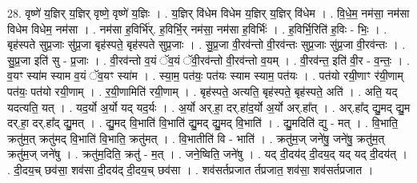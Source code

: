 \documentclass[17pt]{extarticle}
\begin{document}
28. वृष्णे॑ य॒ज्ञिर् य॒ज्ञिर् वृष्णे॒ वृष्णे॑ य॒ज्ञिः । . य॒ज्ञिर् वि॑धेम विधेम य॒ज्ञिर् य॒ज्ञिर् वि॑धेम । . वि॒धे॒म॒ नम॑सा॒ नम॑सा विधेम विधेम॒ नम॑सा । . नम॑सा ह॒विर्भि॑र्. ह॒विर्भि॒र् नम॑सा॒ नम॑सा ह॒विर्भिः॑ । . ह॒विर्भि॒रिति॑ ह॒विः - भिः॒ । . बृह॑स्पते सुप्र॒जाः सु॑प्र॒जा बृह॑स्पते॒ बृह॑स्पते सुप्र॒जाः । . सु॒प्र॒जा वी॒रव॑न्तो वी॒रव॑न्तः सुप्र॒जाः सु॑प्र॒जा वी॒रव॑न्तः । . सु॒प्र॒जा इति॑ सु - प्र॒जाः । . वी॒रव॑न्तो व॒यं ॅव॒यं ॅवी॒रव॑न्तो वी॒रव॑न्तो व॒यम् । . वी॒रव॑न्त॒ इति॑ वी॒र - व॒न्तः॒ । . व॒यꣳ स्या॑म स्याम व॒यं ॅव॒यꣳ स्या॑म । . स्या॒म॒ पत॑यः॒ पत॑यः स्याम स्याम॒ पत॑यः । . पत॑यो रयी॒णाꣳ र॑यी॒णाम् पत॑यः॒ पत॑यो रयी॒णाम् । . र॒यी॒णामिति॑ रयी॒णाम् । . बृह॑स्पते॒ अत्यति॒ बृह॑स्पते॒ बृह॑स्पते॒ अति॑ । . अति॒ यद् यदत्यति॒ यत् । . यद॒र्यो अ॒र्यो यद् यद॒र्यः । . अ॒र्यो अर्.हा॒ दर्.हा॑द॒र्यो अ॒र्यो अर्.हा᳚त् । . अर्.हा᳚द् द्यु॒मद् द्यु॒म दर्.हा॒ दर्.हा᳚द् द्यु॒मत् । . द्यु॒मद् वि॒भाति॑ वि॒भाति॑ द्यु॒मद् द्यु॒मद् वि॒भाति॑ । . द्यु॒मदिति॑ द्यु - मत् । . वि॒भाति॒ क्रतु॑म॒त् क्रतु॑मद् वि॒भाति॑ वि॒भाति॒ क्रतु॑मत् । . वि॒भातीति॑ वि - भाति॑ । . क्रतु॑म॒ज् जने॑षु॒ जने॑षु॒ क्रतु॑म॒त् क्रतु॑म॒ज् जने॑षु । . क्रतु॑म॒दिति॒ क्रतु॑ - म॒त् । . जने॒ष्विति॒ जने॑षु । . यद् दी॒दय॑द् दी॒दय॒द् यद् यद् दी॒दय॑त् । . दी॒दय॒च् छव॑सा॒ शव॑सा दी॒दय॑द् दी॒दय॒च् छव॑सा । . शव॑सर्तप्रजात र्तप्रजात॒ शव॑सा॒ शव॑सर्तप्रजात । \newline
\end{document}

